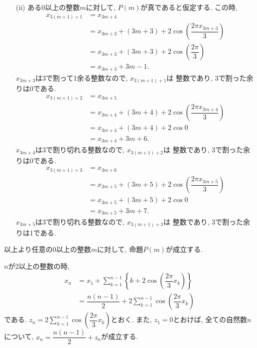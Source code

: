 \documentclass[dvipdfmx,a4paper]{jsarticle}
\newcommand{\2}{I\hspace{-1pt}I}
\newcommand{\3}{I\hspace{-1pt}I\hspace{-1pt}I}
\begin{document}
\begin{itemize}
        \item [(ii)] ある0以上の整数$m$に対して, $P(m)$が真であると仮定する. 
        この時, 
        \begin{align*}
            x_{3 (m+1) + 1} &= x_{3m + 4} \\
            &= x_{3m+3} + (3m+3) + 2\cos\left( \dfrac{2\pi x_{3m+3}}{3} \right)\\
            &= x_{3m+3} + (3m+3) + 2\cos\left( \dfrac{2\pi}{3} \right) \\
            &= x_{3m+3} + 3m -1.
        \end{align*}
        $x_{3m+3}$は3で割って1余る整数なので, $x_{3 (m+1) + 1}$は
        整数であり, 3で割った余りは0である. 
        \begin{align*}
            x_{3 (m+1) + 2} &= x_{3m + 5} \\
            &= x_{3m+4} + (3m+4) + 2\cos\left( \dfrac{2\pi x_{3m+4}}{3} \right)\\
            &= x_{3m+4} + (3m+4) + 2\cos 0 \\
            &= x_{3m+4} + 3m + 6.
        \end{align*}
        $x_{3m+4}$は3で割り切れる整数なので, $x_{3 (m+1) + 2}$は
        整数であり, 3で割った余りは0である. 
        \begin{align*}
            x_{3 (m+1) + 3} &= x_{3m + 6} \\
            &= x_{3m+5} + (3m+5) + 2\cos\left( \dfrac{2\pi x_{3m+5}}{3} \right)\\
            &= x_{3m+5} + (3m+5) + 2\cos 0 \\
            &= x_{3m+5} + 3m + 7.
        \end{align*}
        $x_{3m+5}$は3で割り切れる整数なので, $x_{3 (m+1) + 3}$は
        整数であり, 3で割った余りは1である. 
        
    \end{itemize}

    以上より任意の0以上の整数$m$に対して, 命題$P(m)$が成立する. 

    $n$が2以上の整数の時, 
    \begin{align*} \displaystyle
        x_n 
        &= x_1 + \sum_{k=1}^{n-1} \left\{k + 2 \cos \left( \dfrac{2\pi}{3}x_k\right)\right\} \\
        &= \dfrac{n(n-1)}{2} + 2 \sum_{k=1}^{n-1} \cos \left( \dfrac{2\pi}{3}x_k\right)
    \end{align*}
    である. $\displaystyle z_n = 2 \sum_{k=1}^{n-1} \cos \left( \dfrac{2\pi}{3}x_k\right)$とおく. 
    また, $z_1 = 0$とおけば, 全ての自然数$n$について, $x_n = \dfrac{n(n-1)}{2} + z_n$が成立する. 
\end{document}
